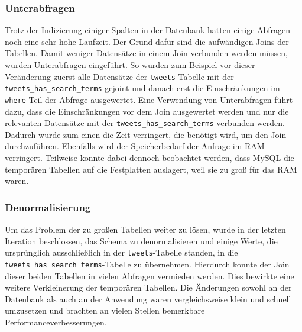 \subsubsection{Unterabfragen}
Trotz der Indizierung einiger Spalten in der Datenbank hatten einige Abfragen noch eine sehr hohe Laufzeit. Der Grund dafür  sind die aufwändigen Joins der Tabellen. Damit weniger Datensätze in einem Join verbunden werden müssen, wurden Unterabfragen eingeführt. So wurden zum Beispiel vor dieser Veränderung zuerst alle Datensätze der \texttt{tweets}-Tabelle mit der \texttt{tweets\_has\_search\_terms} gejoint und danach erst die Einschränkungen im \texttt{where}-Teil der Abfrage ausgewertet. Eine Verwendung von Unterabfragen führt dazu, dass die Einschränkungen vor dem Join ausgewertet werden und nur die relevanten Datensätze mit der \texttt{tweets\_has\_search\_terms} verbunden werden. Dadurch wurde zum einen die Zeit verringert, die benötigt wird, um den Join durchzuführen. Ebenfalls wird der Speicherbedarf der Anfrage im RAM verringert.
Teilweise konnte dabei dennoch beobachtet werden, dass MySQL die temporären Tabellen auf die Festplatten auslagert, weil sie zu groß für das RAM waren.


\subsubsection{Denormalisierung}
Um das Problem der zu großen Tabellen weiter zu lösen, wurde in der letzten Iteration beschlossen, das Schema zu denormalisieren und einige Werte, die ursprünglich ausschließlich in der \texttt{tweets}-Tabelle standen, in die \texttt{tweets\_has\_search\_terms}-Tabelle zu übernehmen. Hierdurch konnte der Join dieser beiden Tabellen in vielen Abfragen vermieden werden. Dies bewirkte eine weitere Verkleinerung der temporären Tabellen.
Die Änderungen sowohl an der Datenbank als auch an der Anwendung waren vergleichsweise klein und schnell umzusetzen und brachten an vielen Stellen bemerkbare Performanceverbesserungen.



